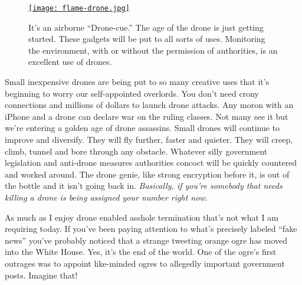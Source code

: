 
\captionsetup[figure]{labelformat=empty}
\begin{SCfigure}
\centering
\href{www.popularmechanics.com/flight/drones/a25282/flame-throwing-drones/}{\texttt{[image: flame-drone.jpg]}}
\caption{It's an airborne ``Drone-cue.'' The age of the drone is just getting
started. These gadgets will be put to all sorts of uses. Monitoring the
environment, with or without the permission of authorities, is an
excellent use of drones.}
\label{fig:5375X0}
\end{SCfigure}


Small inexpensive drones are being put to so many creative uses that
it's beginning to worry our self-appointed overlords. You don't need
crony connections and millions of dollars to launch drone attacks. Any
moron with an iPhone and a drone can declare war on the ruling classes.
Not many see it but we're entering a golden age of drone assassins.
Small drones will continue to improve and diversify. They will fly
further, faster and quieter. They will creep, climb, tunnel and bore
through any obstacle. Whatever silly government legislation and
anti-drone measures authorities concoct will be quickly countered and
worked around. The drone genie, like strong encryption before it, is out
of the bottle and it isn't going back in. \emph{Basically, if you're
somebody that needs killing a drone is being assigned your number right
now.}

As much as I enjoy drone enabled asshole termination that's not what I
am requiring today. If you've been paying attention to what's precisely
labeled ``fake news'' you've probably noticed that a strange tweeting
orange ogre has moved into the White House. Yes, it's the end of the
world. One of the ogre's first outrages was to appoint like-minded ogres
to allegedly important government posts. Imagine that!


